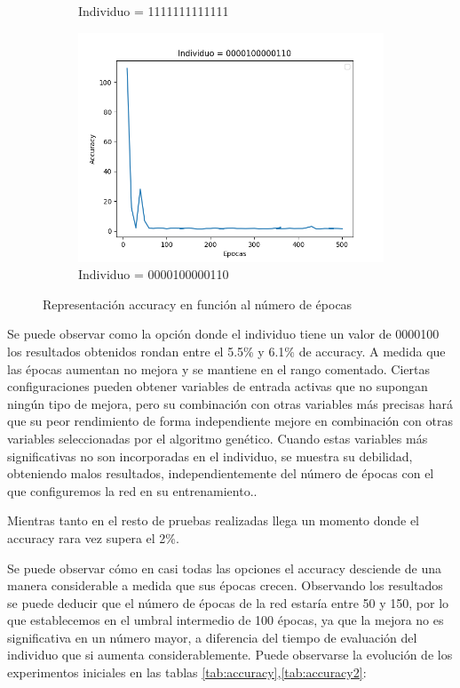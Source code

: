\begin{figure}[h!]
\begin{subfigure}[b]{0.47\linewidth}
\caption{Individuo = 1111111111111}
\label{fig:individuo_1111111111111}
\end{subfigure}
\begin{subfigure}[b]{0.47\linewidth}
 \includegraphics[width=.7\linewidth]{images/Figure_6.png}
\caption{Individuo = 0000100000110}
\label{fig:individuo_0000100000110}
\end{subfigure}
\caption{Representación accuracy en función al número de épocas}
\label{fig:accuracy_epocas_first_eval}
\end{figure}

\newpage
Se puede observar como la opción donde el individuo tiene un valor de 0000100 los resultados obtenidos rondan entre el 5.5\% y 6.1\% de accuracy. A medida que las épocas aumentan no mejora y se mantiene en el rango comentado. Ciertas configuraciones pueden obtener variables de entrada activas que no supongan ningún tipo de mejora, pero su combinación con otras variables más precisas hará que su peor rendimiento de forma independiente mejore en combinación con otras variables seleccionadas por el algoritmo genético. Cuando estas variables más significativas no son incorporadas en el individuo, se muestra su debilidad, obteniendo malos resultados, independientemente del número de épocas con el que configuremos la red en su entrenamiento.. 

Mientras tanto en el resto de pruebas realizadas llega un momento donde el accuracy rara vez supera el 2\%. 


Se puede observar cómo en casi todas las opciones el accuracy desciende de una manera considerable a medida que sus épocas crecen. Observando los resultados se puede deducir que el número de épocas de la red estaría entre 50 y 150, por lo que establecemos en el umbral intermedio de 100 épocas, ya que la mejora no es significativa en un número mayor, a diferencia del tiempo de evaluación del individuo que si aumenta considerablemente. Puede observarse la evolución de los experimentos iniciales en las tablas \ref{tab:accuracy},\ref{tab:accuracy2}:


